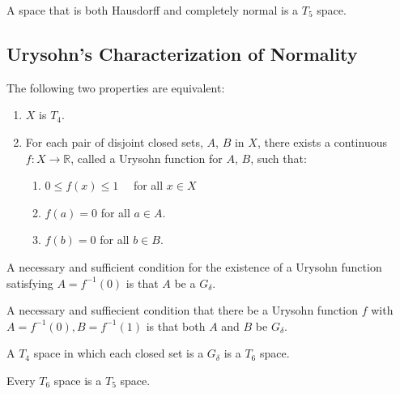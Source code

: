 \documentclass[12pt]{article} %
\begin{document}
\begin{definition} A space that is both Hausdorff and completely normal is a $T_5$ space.
\end{definition}


\subsection{Urysohn's Characterization of Normality}


\begin{theorem} \parencite{Dugundji1966}
The following two properties are equivalent:
\begin{enumerate}
    \item $X$ is $T_4$.
    \item For each pair of disjoint closed sets, $A$, $B$ in $X$, there exists a continuous $f:X \to \mathbb{R}$, called a Urysohn function for $A$, $B$, such that:
    \begin{enumerate}
        \item $0 \leq f(x)\leq 1 \quad$ for all $x \in X$
        \item $f(a)=0$ \quad for all $a \in A$.
        \item $f(b)=0$ \quad for all $b \in B$.  
    \end{enumerate}
\end{enumerate}
\end{theorem}




\begin{corollary}\parencite{Dugundji1966} A necessary and sufficient condition for the existence of a Urysohn function satisfying $A=f^{-1}(0)$ is that $A$ be a $G_\delta$.
\end{corollary}

\begin{corollary}\parencite{Dugundji1966} A necessary and suffiecient condition that there be a Urysohn function $f$ with $A=f^{-1}(0), B=f^{-1}(1)$ is that both $A$ and $B$ be $G_\delta$.
\end{corollary}


\begin{definition}
    A $T_4$ space in which each closed set is a $G_\delta$ is a $T_6$ space.
\end{definition}

\begin{theorem}
    Every $T_6$ space is a $T_5$ space.
\end{theorem}
\end{document}
